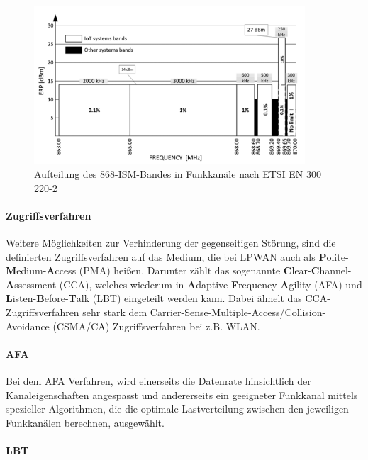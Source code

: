 \begin{figure}[h]
 \centering
 \includegraphics[width=0.9\textwidth]{pictures/868-band}
 \caption[Aufteilung des 868-ISM-Bandes in Funkkanäle nach ETSI EN 300 220-2]{Aufteilung des 868-ISM-Bandes in Funkkanäle nach ETSI EN 300 220-2 \cite{Staniec2020}}
 \label{fig:868-band}
\end{figure}

\paragraph{Zugriffsverfahren}

Weitere Möglichkeiten zur Verhinderung der gegenseitigen Störung, sind die definierten Zugriffsverfahren auf das Medium, die bei LPWAN auch als \textbf{P}olite-\textbf{M}edium-\textbf{A}ccess (PMA) heißen. Darunter zählt das sogenannte \textbf{C}lear-\textbf{C}hannel-\textbf{A}ssessment (CCA), welches wiederum in \textbf{A}daptive-\textbf{F}requency-\textbf{A}gility (AFA) und \textbf{L}isten-\textbf{B}efore-\textbf{T}alk (LBT) eingeteilt werden kann. Dabei ähnelt das CCA-Zugriffsverfahren sehr stark dem Carrier-Sense-Multiple-Access/Collision-Avoidance (CSMA/CA) Zugriffsverfahren bei z.B. WLAN.

\paragraph{AFA}

Bei dem AFA Verfahren, wird einerseits die Datenrate hinsichtlich der Kanaleigenschaften angespasst und andererseits ein geeigneter Funkkanal mittels spezieller Algorithmen, die die optimale Lastverteilung zwischen den jeweiligen Funkkanälen berechnen, ausgewählt. 

\paragraph{LBT}

